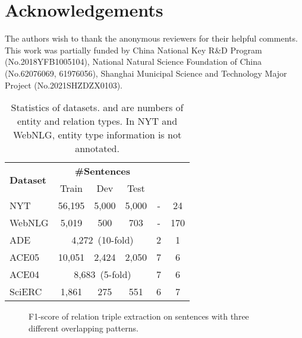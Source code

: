 \documentclass[11pt]{article}
\begin{document}
\section{Acknowledgements}
The authors wish to thank the anonymous reviewers for their helpful comments. This work was partially funded by China National Key R\&D Program (No.2018YFB1005104), National Natural Science Foundation of China (No.62076069, 61976056), Shanghai Municipal Science and Technology Major Project (No.2021SHZDZX0103).







\appendix


\begin{table}[]
\small
\centering
\begin{spacing}{1.19}
\begin{threeparttable}
\begin{tabular}{lccccc}
\bottomrule
\multirow{2}{*}{\textbf{Dataset}} & \multicolumn{3}{c}{\textbf{\#Sentences}} & \multirow{2}{*}{} & \multirow{2}{*}{} \\
 & Train & Dev & Test & & \\
\hline
NYT & 56,195 & 5,000 & 5,000 & - & 24 \\
WebNLG & 5,019 & 500 & 703 & - & 170 \\
ADE & \multicolumn{3}{c}{4,272\ (10-fold)} & 2 & 1 \\
ACE05 & 10,051 & 2,424 & 2,050 & 7 & 6 \\
ACE04 & \multicolumn{3}{c}{8,683\ (5-fold)} & 7 & 6 \\
SciERC & 1,861 & 275 & 551 &6 &7 \\
\toprule
\end{tabular} 
\end{threeparttable}
\end{spacing}
\caption{Statistics of datasets.  and  are numbers of entity and relation types. In NYT and WebNLG, entity type information is not annotated.}
\label{tab:my-table1}
\end{table}


\begin{figure*}[htbp]
  \vspace{-0.2cm}
  \centering
  \hspace{-0.02\textwidth}
  \vspace{-0.2cm}
  \caption{\label{fig: normal-epo-spo} F1-score of relation triple extraction on sentences with three different overlapping patterns. }
\end{figure*}
\end{document}
